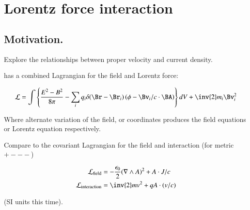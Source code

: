 
%
%



\chapter{Lorentz force interaction } %
\label{chap:lorentzTxEmPotential}
\date{ October 17, 2008.  $RCSfile: lorentzTxEmPotential.tex,v $ Last $Revision: 1.12 $ $Date: 2009/06/14 23:51:45 $ }

%


\section{Motivation.}

Explore the relationships between proper velocity and current density.

\cite{goldstein1951cm} has a combined Lagrangian for the field and Lorentz force:

\begin{align*}
\LL = \int \left\{ \frac{E^2 - B^2}{8 \pi} - \sum_i q_i \delta(\Br-\Br_i)\left(\phi - \Bv_i/c \cdot \BA\right)\right\} dV + \inv{2} m_i \Bv_i^2
\end{align*}

Where alternate variation of the field, or coordinates produces the field equations or Lorentz equation respectively.

Compare to the covariant Lagrangian for the field and interaction (for metric $+---$)

\begin{align}\label{eqn:lorentz_tx_em_potential:maxlag}
\LL_{\text{field}} &= -\frac{\epsilon_0}{2} (\grad \wedge A)^2 + A \cdot J/c \\
\LL_{\text{interaction}} &= \inv{2} m v^2 + q A \cdot (v/c)
\end{align}

(SI units this time).

